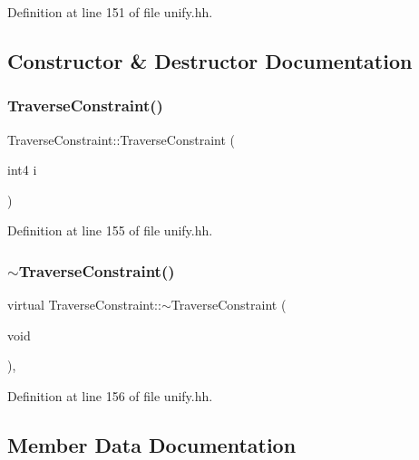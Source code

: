 Definition at line 151 of file unify.\+hh.



\subsection{Constructor \& Destructor Documentation}
\mbox{\label{class_traverse_constraint_a55ddc33686bfcc6c329737b8dc49068c}} 
\subsubsection{\texorpdfstring{TraverseConstraint()}{TraverseConstraint()}}
{\footnotesize\ttfamily Traverse\+Constraint\+::\+Traverse\+Constraint (\begin{DoxyParamCaption}\item[{int4}]{i }\end{DoxyParamCaption})\hspace{0.3cm}{\ttfamily [inline]}}



Definition at line 155 of file unify.\+hh.

\mbox{\label{class_traverse_constraint_a9e5c1ad1d4cc4c9db08cba9fa5e8f009}} 
\subsubsection{\texorpdfstring{$\sim$TraverseConstraint()}{~TraverseConstraint()}}
{\footnotesize\ttfamily virtual Traverse\+Constraint\+::$\sim$\+Traverse\+Constraint (\begin{DoxyParamCaption}\item[{void}]{ }\end{DoxyParamCaption})\hspace{0.3cm}{\ttfamily [inline]}, {\ttfamily [virtual]}}



Definition at line 156 of file unify.\+hh.



\subsection{Member Data Documentation}
\mbox{\label{class_traverse_constraint_a359ab5546ee64533599d44d171637306}} 
